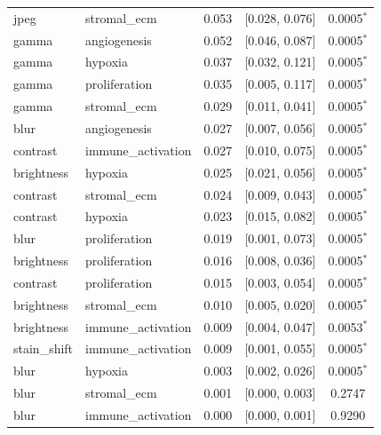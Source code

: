 \begin{table}[t]
\begin{tabular}{llccc}
jpeg & stromal\_ecm & 0.053 & [0.028, 0.076] & 0.0005$^{*}$ \\
gamma & angiogenesis & 0.052 & [0.046, 0.087] & 0.0005$^{*}$ \\
gamma & hypoxia & 0.037 & [0.032, 0.121] & 0.0005$^{*}$ \\
gamma & proliferation & 0.035 & [0.005, 0.117] & 0.0005$^{*}$ \\
gamma & stromal\_ecm & 0.029 & [0.011, 0.041] & 0.0005$^{*}$ \\
blur & angiogenesis & 0.027 & [0.007, 0.056] & 0.0005$^{*}$ \\
contrast & immune\_activation & 0.027 & [0.010, 0.075] & 0.0005$^{*}$ \\
brightness & hypoxia & 0.025 & [0.021, 0.056] & 0.0005$^{*}$ \\
contrast & stromal\_ecm & 0.024 & [0.009, 0.043] & 0.0005$^{*}$ \\
contrast & hypoxia & 0.023 & [0.015, 0.082] & 0.0005$^{*}$ \\
blur & proliferation & 0.019 & [0.001, 0.073] & 0.0005$^{*}$ \\
brightness & proliferation & 0.016 & [0.008, 0.036] & 0.0005$^{*}$ \\
contrast & proliferation & 0.015 & [0.003, 0.054] & 0.0005$^{*}$ \\
brightness & stromal\_ecm & 0.010 & [0.005, 0.020] & 0.0005$^{*}$ \\
brightness & immune\_activation & 0.009 & [0.004, 0.047] & 0.0053$^{*}$ \\
stain\_shift & immune\_activation & 0.009 & [0.001, 0.055] & 0.0005$^{*}$ \\
blur & hypoxia & 0.003 & [0.002, 0.026] & 0.0005$^{*}$ \\
blur & stromal\_ecm & 0.001 & [0.000, 0.003] & 0.2747 \\
blur & immune\_activation & 0.000 & [0.000, 0.001] & 0.9290 \\
\bottomrule
\end{tabular}
\end{table}
